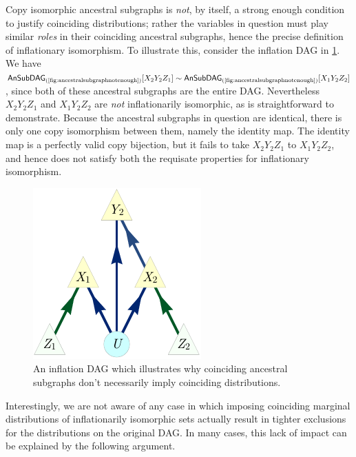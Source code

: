 Copy isomorphic ancestral subgraphs is \emph{not}, by itself, a strong enough condition to justify coinciding distributions; rather the variables in question must play similar \emph{roles} in their coinciding ancestral subgraphs, hence the precise definition of inflationary isomorphism. To illustrate this, consider the inflation DAG in \cref{fig:ancestralsubgraphnotenough}. We have $\ansubgraph[(\textrm{\cref{fig:ancestralsubgraphnotenough}})]{X_2 Y_2 Z_1}\sim\ansubgraph[(\textrm{\cref{fig:ancestralsubgraphnotenough}})]{X_1 Y_2 Z_2}$, since both of these ancestral subgraphs are the entire DAG. Nevertheless ${X_2 Y_2 Z_1}$ and ${X_1 Y_2 Z_2}$ are \emph{not} inflationarily isomorphic, as is straightforward to demonstrate. Because the ancestral subgraphs in question are identical, there is only one copy isomorphism between them, namely the identity map. The identity map is a perfectly valid copy bijection, but it fails to take ${X_2 Y_2 Z_1}$ to ${X_1 Y_2 Z_2}$, and hence does not satisfy both the requisate properties for inflationary isomorphism. 

\begin{figure}[H]
    \centering
    \begin{minipage}[t]{0.6\linewidth}      \centering
    \includegraphics[scale=1]{instrumentalvariant.pdf}
    \caption{An inflation DAG which illustrates why coinciding ancestral subgraphs don't necessarily imply coinciding distributions.}
    \label{fig:ancestralsubgraphnotenough}
    \end{minipage}
\end{figure}


Interestingly, we are not aware of any case in which imposing coinciding marginal distributions of inflationarily isomorphic sets actually result in tighter exclusions for the distributions on the original DAG. In many cases, this lack of impact can be explained by the following argument.

